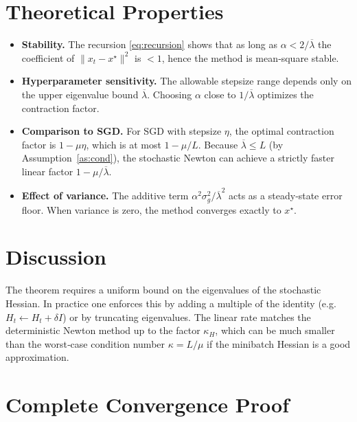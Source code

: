 \documentclass[11pt]{article}
\begin{document}
\section{Theoretical Properties}
\begin{itemize}[leftmargin=*]
\item \textbf{Stability.} The recursion \eqref{eq:recursion} shows that as long as
$\alpha<2/\overline{\lambda}$ the coefficient of $\|x_{t}-x^{\star}\|^{2}$ is $<1$,
hence the method is mean‑square stable.
\item \textbf{Hyperparameter sensitivity.} The allowable stepsize range depends only on
the upper eigenvalue bound $\overline{\lambda}$.  Choosing $\alpha$ close to $1/\overline{\lambda}$
optimizes the contraction factor.
\item \textbf{Comparison to SGD.} For SGD with stepsize $\eta$, the optimal
contraction factor is $1-\mu\eta$, which is at most $1-\mu/L$.
Because $\overline{\lambda}\le L$ (by Assumption~\ref{as:cond}), the stochastic Newton can
achieve a strictly faster linear factor $1-\mu/\overline{\lambda}$.
\item \textbf{Effect of variance.} The additive term
$\alpha^{2}\sigma_{g}^{2}/\overline{\lambda}^{2}$ acts as a steady‑state error floor.
When variance is zero, the method converges exactly to $x^{\star}$.
\end{itemize}

\section{Discussion}
The theorem requires a uniform bound on the eigenvalues of the stochastic Hessian.
In practice one enforces this by adding a multiple of the identity
(e.g. $H_{t}\leftarrow H_{t}+\delta I$) or by truncating eigenvalues.
The linear rate matches the deterministic Newton method up to the factor
$\kappa_{H}$, which can be much smaller than the worst‑case condition number
$\kappa=L/\mu$ if the minibatch Hessian is a good approximation.

\section*{Complete Convergence Proof}
\end{document}
